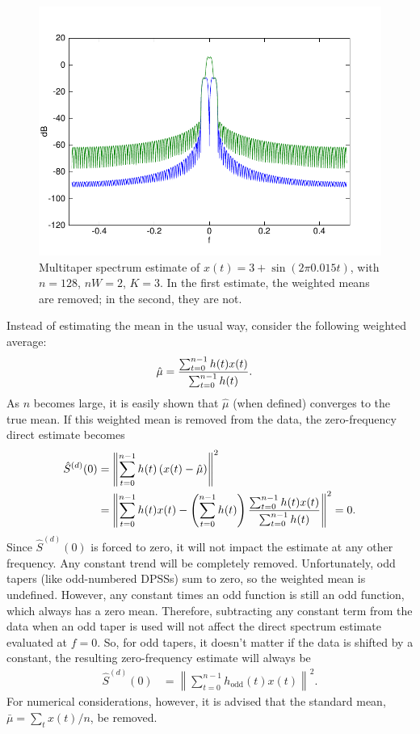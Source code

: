 \begin{figure}[!tb]
    \centering
    \includegraphics[width=4.75in]{pics/mean_remove128.pdf}
    \caption[Removing weighted means to reduce bias]{Multitaper spectrum estimate of $x(t)=3+\sin(2\pi0.015t)$, with $n=128$, $nW=2$, $K=3$.  In the \textcolor{blue!80!black}{first} estimate, the weighted means are removed; in the \textcolor{green!40!black}{second}, they are not. \label{fig:mt_mean}}
\end{figure}

Instead of estimating the mean in the usual way, consider the following weighted average:
\begin{align*}
    \hat{\mu} & = \dfrac{\sum_{t=0}^{n-1} h(t)x(t)}{\sum_{t=0}^{n-1} h(t)}.\index{weighted mean}
\end{align*}
As $n$ becomes large, it is easily shown that $\hat{\mu}$ (when defined) converges to the true mean.  If this weighted mean is removed from the data, the zero-frequency direct estimate becomes
\begin{align*}
    \hat{S}^{(d)}(0) & = \left\|\sum_{t=0}^{n-1}h(t)\left(x(t)-\hat{\mu}\right)\right\|^2\\
& = \left\|\sum_{t=0}^{n-1}h(t)x(t) - \left(\sum_{t=0}^{n-1}h(t)\right)\dfrac{\sum_{t=0}^{n-1} h(t)x(t)}{\sum_{t=0}^{n-1} h(t)} \right\|^2 = 0.\index{weighted mean!removal of}
\end{align*}
Since $\hat{S}^{(d)}(0)$ is forced to zero, it will not impact the estimate at any other frequency.  Any constant trend will be completely removed.  Unfortunately, odd tapers (like odd-numbered DPSSs) sum to zero, so the weighted mean is undefined.  However, any constant times an odd function is still an odd function, which always has a zero mean.  Therefore, subtracting any constant term from the data when an odd taper is used will not affect the direct spectrum estimate evaluated at $f=0$.  So, for odd tapers, it doesn't matter if the data is shifted by a constant, the resulting zero-frequency estimate will always be
\begin{align*}
    \hat{S}^{(d)}(0) & = \left\|\sum_{t=0}^{n-1}h_{\text{odd}}(t)x(t)\right\|^2.
\end{align*}
For numerical considerations, however, it is advised that the standard mean, $\bar{\mu}=\sum_t x(t)/n$, be removed.

